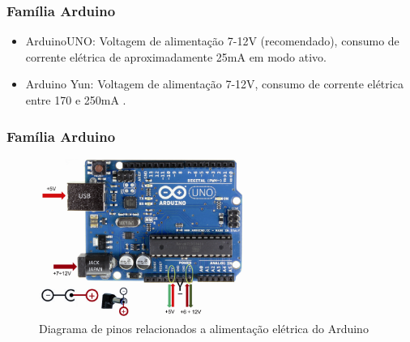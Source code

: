 \documentclass{beamer}
\begin{document}
\begin{frame}
\frametitle{Família Arduino}
\begin{minipage}{\textwidth}
	\begin{itemize}
		\item ArduinoUNO: Voltagem de alimentação 7-12V\cite{arduino-uno}  (recomendado), consumo de corrente elétrica de aproximadamente 25mA\cite{arduino_forum1} em modo ativo.
		\item Arduino Yun: Voltagem de alimentação 7-12V, consumo de corrente elétrica entre 170 e 250mA\cite{arduino_forum2} .
		
	\end{itemize}
\end{minipage}
\end{frame} 







\begin{frame}
	\frametitle{Família Arduino}
	\begin{minipage}{\textwidth}
		\begin{figure}[!ht]
			\centering
			\includegraphics[width=0.6\textwidth]{arduino_power_pinout.png}
			\caption{Diagrama de pinos relacionados a alimentação elétrica do Arduino}
			\label{fig:ndfgode_power_pins}
			\vspace{-10pt}
		\end{figure}
		
	\end{minipage}
\end{frame} 
\end{document}
